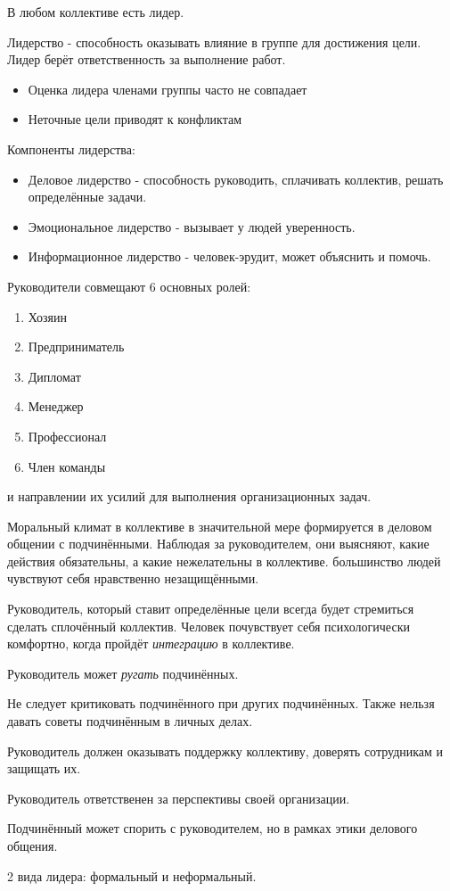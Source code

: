 В любом коллективе есть лидер.

Лидерство - способность оказывать влияние в группе для достижения цели. Лидер берёт ответственность за выполнение работ.

\begin{itemize}
    \item Оценка лидера членами группы часто не совпадает
    \item Неточные цели приводят к конфликтам
\end{itemize}

Компоненты лидерства:
\begin{itemize}
    \item Деловое лидерство - способность руководить, сплачивать коллектив, решать определённые задачи.
    \item Эмоциональное лидерство - вызывает у людей уверенность.
    \item Информационное лидерство - человек-эрудит, может объяснить и помочь.
\end{itemize}

Руководители совмещают 6 основных ролей:
\begin{enumerate}
    \item Хозяин
    \item Предприниматель
    \item Дипломат
    \item Менеджер
    \item Профессионал
    \item Член команды
\end{enumerate}

\missed{} и направлении их усилий для выполнения организационных задач.

Моральный климат в коллективе в значительной мере формируется в деловом общении с подчинёнными. Наблюдая за руководителем, они выясняют, какие действия обязательны, а какие нежелательны в коллективе.
\missed{} большинство людей чувствуют себя нравственно незащищёнными.

Руководитель, который ставит определённые цели всегда будет стремиться сделать сплочённый коллектив. Человек почувствует себя психологически комфортно, когда пройдёт \textit{интеграцию} в коллективе.

Руководитель может \textit{ругать} подчинённых.

Не следует критиковать подчинённого при других подчинённых. Также нельзя давать советы подчинённым в личных делах.

Руководитель должен оказывать поддержку коллективу, доверять сотрудникам и защищать их.

Руководитель ответственен за перспективы своей организации.

Подчинённый может спорить с руководителем, но в рамках этики делового общения.

2 вида лидера: формальный и неформальный.

